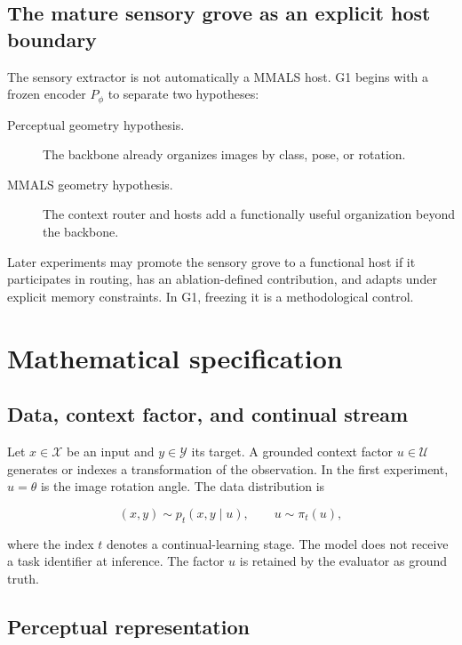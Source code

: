 \documentclass[11pt,a4paper]{article}
\begin{document}
\subsection{The mature sensory grove as an explicit host boundary}

The sensory extractor is not automatically a MMALS host. G1 begins with a frozen encoder \(P_\phi\) to separate two hypotheses:

\begin{description}
\item[Perceptual geometry hypothesis.] The backbone already organizes images by class, pose, or rotation.
\item[MMALS geometry hypothesis.] The context router and hosts add a functionally useful organization beyond the backbone.
\end{description}

Later experiments may promote the sensory grove to a functional host if it participates in routing, has an ablation-defined contribution, and adapts under explicit memory constraints. In G1, freezing it is a methodological control.

\section{Mathematical specification}

\subsection{Data, context factor, and continual stream}

Let \(x\in\mathcal{X}\) be an input and \(y\in\mathcal{Y}\) its target. A grounded context factor \(u\in\mathcal{U}\) generates or indexes a transformation of the observation. In the first experiment, \(u=\theta\) is the image rotation angle. The data distribution is

\begin{equation}
(x,y)\sim p_t(x,y\mid u), \qquad u\sim \pi_t(u),
\end{equation}

where the index \(t\) denotes a continual-learning stage. The model does not receive a task identifier at inference. The factor \(u\) is retained by the evaluator as ground truth.

\subsection{Perceptual representation}
\end{document}
